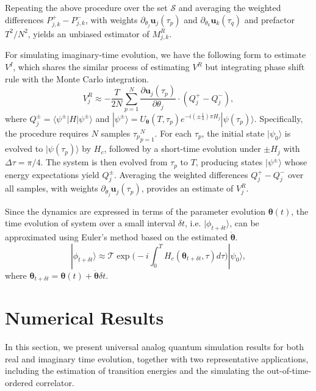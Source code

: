 \documentclass[twocolumn,
pra,aps,superscriptaddress,showpacs,amsmath,amssymb]{revtex4-2}
\begin{document}
Repeating the above procedure over the set $\mathcal{S}$ and averaging the weighted differences $P_{j,k}^{+}-P_{j,k}^{-}$, with weights $\partial_{\theta_j}\bm{u}_j(\tau_p)$ and $\partial_{\theta_k}\bm{u}_k(\tau_q)$ and prefactor $T^2/N^2$, yields an unbiased estimator of $M^{R}_{j,k}$.

For simulating imaginary-time evolution, we have the following form to estimate $V^I$, which shares the similar process of estimating $V^R$ but integrating phase shift rule with the Monte Carlo integration. 
\begin{equation}
V_{j}^R \approx -\frac{T}{2N}\sum_{p=1}^N \frac{\partial{\bm{u}_j}(\tau_p)}{\partial{\theta_j}} \cdot \left(Q_{j}^{+} - Q_{j}^{-}\right),  
\end{equation}
where $Q_{j}^{\pm} = \langle \psi^{\pm}|H|\psi^{\pm}\rangle$ and $|\psi^{\pm}\rangle = U_{\bm{\theta}} (T,\tau_p) e^{-i(\pm\frac{1}{4})\pi H_j}|\psi(\tau_p)\rangle$. 
Specifically, the procedure requires $N$ samples ${\tau_p}_{p=1}^N$. For each $\tau_p$, the initial state $|\psi_0\rangle$ is evolved to $|\psi(\tau_p)\rangle$ by $H_c$,  followed by a short-time evolution under $\pm H_j$ with $\Delta\tau=\pi/4$. The system is then evolved from $\tau_p$ to $T$, producing states $|\psi^{\pm}\rangle$ whose energy expectations yield $Q_j^{\pm}$. Averaging the weighted differences $Q_j^{+}-Q_j^{-}$ over all samples, with weights $\partial_{\theta_j}\bm{u}_j(\tau_p)$, provides an estimate of $V_j^{R}$.


Since the dynamics are expressed in terms of the parameter evolution $\bm{\theta}(t)$, the time evolution of system over a small interval $\delta t$, i.e. $|\phi_{t+\delta t}\rangle$, can be approximated using Euler’s method based on the estimated $\dot{\bm{\theta}}$.
\begin{equation}
|\phi_{t+\delta t}\rangle \approx \mathcal{T} \exp\bigg(-i\int_0^T H_c(\bm{\theta}_{t+\delta t},\tau)d\tau\bigg)|\psi_0\rangle,
\end{equation}
where $\bm{\theta}_{t+\delta t} = \bm{\theta}(t) + \dot{\bm{\theta}}\delta t$.

\section{Numerical Results}
In this section, we present universal analog quantum simulation results for both real and imaginary time evolution, together with two representative applications, including the estimation of transition energies and the simulating the out-of-time-ordered correlator.
\end{document}
